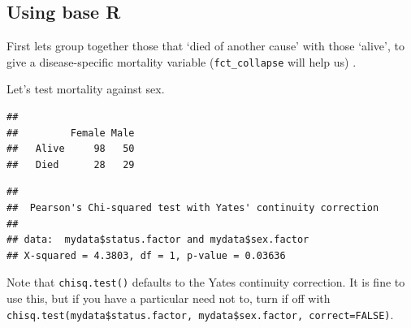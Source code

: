 \documentclass[]{book}
\makeatletter
\newenvironment{Shaded}{\begin{snugshade}}{\end{snugshade}}
\newcommand{\KeywordTok}[1]{\textcolor[rgb]{0.13,0.29,0.53}{\textbf{#1}}}
\newcommand{\NormalTok}[1]{#1}
\newcommand{\OperatorTok}[1]{\textcolor[rgb]{0.81,0.36,0.00}{\textbf{#1}}}
\newcommand{\StringTok}[1]{\textcolor[rgb]{0.31,0.60,0.02}{#1}}
\newenvironment{kframe}{%
\medskip{}
\setlength{\fboxsep}{.8em}
 \def\at@end@of@kframe{}%
 \ifinner\ifhmode%
  \def\at@end@of@kframe{\end{minipage}}%
  \begin{minipage}{\columnwidth}%
 \fi\fi%
 \def\FrameCommand##1{\hskip\@totalleftmargin \hskip-\fboxsep
 \colorbox{shadecolor}{##1}\hskip-\fboxsep
     \hskip-\linewidth \hskip-\@totalleftmargin \hskip\columnwidth}%
 \MakeFramed {\advance\hsize-\width
   \@totalleftmargin\z@ \linewidth\hsize
   \@setminipage}}%
 {\par\unskip\endMakeFramed%
 \at@end@of@kframe}
\renewenvironment{Shaded}{\begin{kframe}}{\end{kframe}}
\theoremstyle{definition}
\theoremstyle{definition}
\theoremstyle{definition}
\theoremstyle{remark}
\makeatother
\begin{document}
\hypertarget{using-base-r}{%
\subsection{Using base R}\label{using-base-r}}

First lets group together those that `died of another cause' with those
`alive', to give a disease-specific mortality variable
(\texttt{fct\_collapse} will help us) .

\begin{Shaded}
\end{Shaded}

Let's test mortality against sex.

\begin{Shaded}
\end{Shaded}

\begin{verbatim}
##        
##         Female Male
##   Alive     98   50
##   Died      28   29
\end{verbatim}

\begin{Shaded}
\end{Shaded}

\begin{verbatim}
## 
##  Pearson's Chi-squared test with Yates' continuity correction
## 
## data:  mydata$status.factor and mydata$sex.factor
## X-squared = 4.3803, df = 1, p-value = 0.03636
\end{verbatim}

Note that \texttt{chisq.test()} defaults to the Yates continuity
correction. It is fine to use this, but if you have a particular need
not to, turn if off with
\texttt{chisq.test(mydata\$status.factor,\ mydata\$sex.factor,\ correct=FALSE)}.
\end{document}
